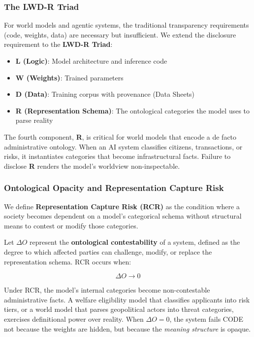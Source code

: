 \documentclass{article}
\begin{document}
\subsubsection{The LWD-R Triad}

For world models and agentic systems, the traditional transparency requirements (code, weights, data) are necessary but insufficient. We extend the disclosure requirement to the \textbf{LWD-R Triad}:

\begin{itemize}[noitemsep]
    \item \textbf{L (Logic)}: Model architecture and inference code
    \item \textbf{W (Weights)}: Trained parameters
    \item \textbf{D (Data)}: Training corpus with provenance (Data Sheets)
    \item \textbf{R (Representation Schema)}: The ontological categories the model uses to parse reality
\end{itemize}

The fourth component, \textbf{R}, is critical for world models that encode a de facto administrative ontology. When an AI system classifies citizens, transactions, or risks, it instantiates categories that become infrastructural facts. Failure to disclose \textbf{R} renders the model's worldview non-inspectable.

\subsubsection{Ontological Opacity and Representation Capture Risk}
\label{subsubsec:rcr}

We define \textbf{Representation Capture Risk (RCR)} as the condition where a society becomes dependent on a model's categorical schema without structural means to contest or modify those categories.

Let $\Delta O$ represent the \textbf{ontological contestability} of a system, defined as the degree to which affected parties can challenge, modify, or replace the representation schema. RCR occurs when:

\begin{equation}
\Delta O \to 0
\end{equation}

Under RCR, the model's internal categories become non-contestable administrative facts. A welfare eligibility model that classifies applicants into risk tiers, or a world model that parses geopolitical actors into threat categories, exercises definitional power over reality. When $\Delta O = 0$, the system fails CODE not because the weights are hidden, but because the \textit{meaning structure} is opaque.
\end{document}
